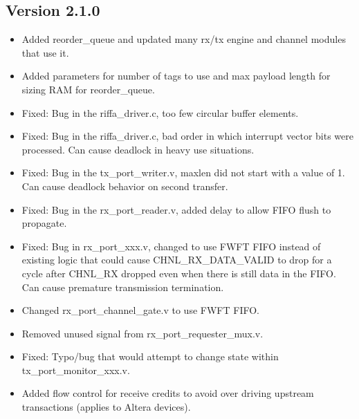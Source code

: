 \documentclass{refrep}
\begin{document}
\subsection{Version 2.1.0}
\begin{itemize}

\item Added reorder\_queue and updated many rx/tx engine and channel modules that 
  use it.
\item Added parameters for number of tags to use and max payload length for sizing 
  RAM for reorder\_queue.
\item Fixed: Bug in the riffa\_driver.c, too few circular buffer elements.
\item Fixed: Bug in the riffa\_driver.c, bad order in which interrupt vector bits 
  were processed. Can cause deadlock in heavy use situations.
\item Fixed: Bug in the tx\_port\_writer.v, maxlen did not start with a value of 1.
  Can cause deadlock behavior on second transfer.
\item Fixed: Bug in the rx\_port\_reader.v, added delay to allow FIFO flush to 
  propagate.
\item Fixed: Bug in rx\_port\_xxx.v, changed to use FWFT FIFO instead of existing 
  logic that could cause CHNL\_RX\_DATA\_VALID to drop for a cycle after CHNL\_RX 
  dropped even when there is still data in the FIFO. Can cause premature 
  transmission termination.
\item Changed rx\_port\_channel\_gate.v to use FWFT FIFO.
\item Removed unused signal from rx\_port\_requester\_mux.v.
\item Fixed: Typo/bug that would attempt to change state within 
  tx\_port\_monitor\_xxx.v.
\item Added flow control for receive credits to avoid over driving upstream transactions
  (applies to Altera devices).
\end{itemize}
\end{document}
